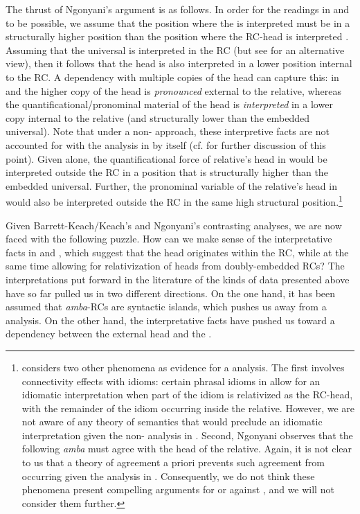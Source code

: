 \documentclass[output=paper
,newtxmath
,modfonts
,nonflat]{langsci/langscibook}
\begin{document}
The thrust of Ngonyani’s argument is as follows. In order for the readings in  and  to be possible, we assume that the position where the  is interpreted must be in a structurally higher position than the position where the RC-head is interpreted \citep[cf.][]{Heim1998}. Assuming that the universal is interpreted in the RC (but see  for an alternative view), then it follows that the head is also interpreted in a lower position internal to the RC. A  dependency with multiple copies of the head can capture this: in  and  the higher copy of the head is \textit{pronounced} external to the relative, whereas the quantificational/pronominal material of the head is \textit{interpreted} in a lower copy internal to the relative (and structurally lower than the embedded universal). Note that under a non- approach, these interpretive facts are not accounted for with the analysis in  by itself (cf.  for further discussion of this point). Given  alone, the quantificational force of relative’s head in  would be interpreted outside the RC in a position that is structurally higher than the embedded universal. Further, the pronominal variable of the relative’s head in  would also be interpreted outside the RC in the same high structural position.{}\footnote{\citet{Ngonyani2001} considers two other phenomena as evidence for a  analysis. The first involves connectivity effects with idioms: certain phrasal idioms in  allow for an idiomatic interpretation when part of the idiom is relativized as the RC-head, with the remainder of the idiom occurring inside the relative. However, we are not aware of any theory of semantics that would preclude an idiomatic interpretation given the non- analysis in . Second, Ngonyani observes that the  following \textit{amba} must agree with the head of the relative. Again, it is not clear to us that a theory of agreement a priori prevents such agreement from occurring given the analysis in . Consequently, we do not think these phenomena present compelling arguments for or against , and we will not consider them further.}

Given Barrett-Keach/Keach’s and Ngonyani’s contrasting analyses, we are now faced with the following puzzle. How can we make sense of the interpretative facts in  and , which suggest that the head originates within the RC, while at the same time allowing for relativization of heads from doubly-embedded RCs? The interpretations put forward in the literature of the kinds of data presented above have so far pulled us in two different directions. On the one hand, it has been assumed that \textit{amba}{}-RCs are syntactic islands, which pushes us away from a  analysis. On the other hand, the interpretative facts have pushed us toward a  dependency between the external head and the .
\end{document}
